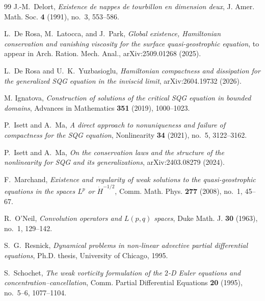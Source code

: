 \documentclass[11pt,reqno]{amsproc}
\begin{document}
\begin{thebibliography}{99}
J.-M.~Delort,
\emph{Existence de nappes de tourbillon en dimension deux},
J. Amer. Math. Soc. \textbf{4} (1991), no.~3, 553--586.

L.~De Rosa, M.~Latocca, and J.~Park,
\emph{Global existence, Hamiltonian conservation and vanishing viscosity for
the surface quasi-geostrophic equation},
to appear in Arch. Ration. Mech. Anal., arXiv:2509.01268 (2025).

L.~De Rosa and U.~K.~Yuzbasioglu,
\emph{Hamiltonian compactness and dissipation for the generalized SQG equation
in the inviscid limit},
arXiv:2604.19732 (2026).

M. Ignatova, \emph{Construction of solutions of the critical SQG equation in bounded domains}, 
Advances in Mathematics \textbf{351} (2019), 1000–1023.

P.~Isett and A.~Ma,
\emph{A direct approach to nonuniqueness and failure of compactness for the
SQG equation},
Nonlinearity \textbf{34} (2021), no.~5, 3122--3162.

P.~Isett and A.~Ma,
\emph{On the conservation laws and the structure of the nonlinearity for SQG
and its generalizations},
arXiv:2403.08279 (2024).

F.~Marchand,
\emph{Existence and regularity of weak solutions to the quasi-geostrophic
equations in the spaces $L^p$ or $\dot H^{-1/2}$},
Comm. Math. Phys. \textbf{277} (2008), no.~1, 45--67.

R.~O'Neil,
\emph{Convolution operators and $L(p,q)$ spaces},
Duke Math. J. \textbf{30} (1963), no.~1, 129--142.

S.~G.~Resnick,
\emph{Dynamical problems in non-linear advective partial differential
equations},
Ph.D. thesis, University of Chicago, 1995.

S.~Schochet,
\emph{The weak vorticity formulation of the $2$-D Euler equations and
concentration--cancellation},
Comm. Partial Differential Equations \textbf{20} (1995), no.~5--6, 1077--1104.
\enlargethispage{4\baselineskip}
\end{thebibliography}
\end{document}
